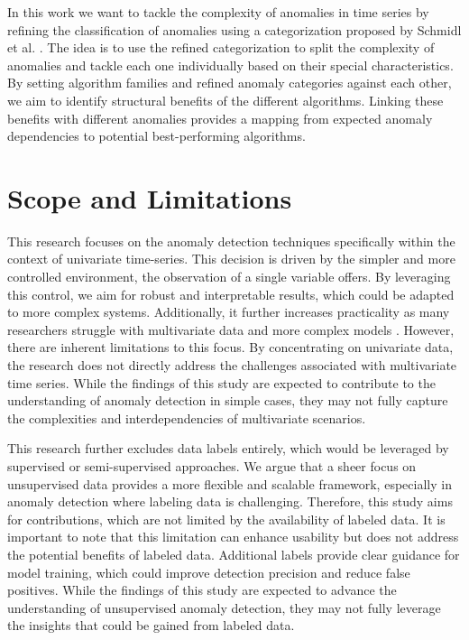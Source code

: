 In this work we want to tackle the complexity of anomalies in time series by refining the classification of anomalies using a categorization proposed by Schmidl et al. \cite{Schmidl2022}. The idea is to use the refined categorization to split the complexity of anomalies and tackle each one individually based on their special characteristics. By setting algorithm families and refined anomaly categories against each other, we aim to identify structural benefits of the different algorithms. Linking these benefits with different anomalies provides a mapping from expected anomaly dependencies to potential best-performing algorithms.

\section{Scope and Limitations}
This research focuses on the anomaly detection techniques specifically within the context of univariate time-series. This decision is driven by the simpler and more controlled environment, the observation of a single variable offers. By leveraging this control, we aim for robust and interpretable results, which could be adapted to more complex systems. Additionally, it further increases practicality as many researchers struggle with multivariate data and more complex models \cite{Chandola2009}. 
However, there are inherent limitations to this focus. By concentrating on univariate data, the research does not directly address the challenges associated with multivariate time series. 
While the findings of this study are expected to contribute to the understanding of anomaly detection in simple cases, they may not fully capture the complexities and interdependencies of multivariate scenarios. 

This research further excludes data labels entirely, which would be leveraged by supervised or semi-supervised approaches. We argue that a sheer focus on unsupervised data provides a more flexible and scalable framework, especially in anomaly detection where labeling data is challenging. Therefore, this study aims for contributions, which are not limited by the availability of labeled data.
It is important to note that this limitation can enhance usability but does not address the potential benefits of labeled data. Additional labels provide clear guidance for model training, which could improve detection precision and reduce false positives. While the findings of this study are expected to advance the understanding of unsupervised anomaly detection, they may not fully leverage the insights that could be gained from labeled data.

